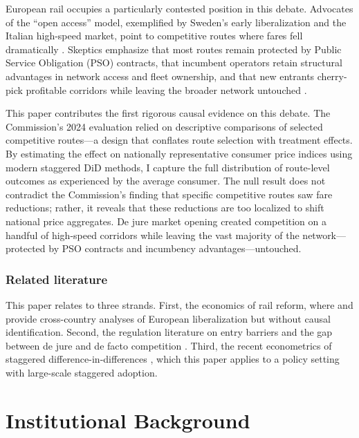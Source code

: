 \documentclass[12pt]{article}
\begin{document}
European rail occupies a particularly contested position in this debate. Advocates of the ``open access'' model, exemplified by Sweden's early liberalization and the Italian high-speed market, point to competitive routes where fares fell dramatically \citep{friebel2010competition, bougette2019competition}. Skeptics emphasize that most routes remain protected by Public Service Obligation (PSO) contracts, that incumbent operators retain structural advantages in network access and fleet ownership, and that new entrants cherry-pick profitable corridors while leaving the broader network untouched \citep{nash2008passenger, knieps2013competition, white2013evaluating}.

This paper contributes the first rigorous causal evidence on this debate. The Commission's 2024 evaluation \citep{ec2024fourth} relied on descriptive comparisons of selected competitive routes---a design that conflates route selection with treatment effects. By estimating the effect on nationally representative consumer price indices using modern staggered DiD methods, I capture the full distribution of route-level outcomes as experienced by the average consumer. The null result does not contradict the Commission's finding that specific competitive routes saw fare reductions; rather, it reveals that these reductions are too localized to shift national price aggregates. De jure market opening created competition on a handful of high-speed corridors while leaving the vast majority of the network---protected by PSO contracts and incumbency advantages---untouched.

\subsubsection*{Related literature} This paper relates to three strands. First, the economics of rail reform, where \citet{nash2008passenger} and \citet{friebel2010competition} provide cross-country analyses of European liberalization but without causal identification. Second, the regulation literature on entry barriers and the gap between de jure and de facto competition \citep{djankov2002regulation, peltzman1976toward, stigler1971theory}. Third, the recent econometrics of staggered difference-in-differences \citep{callaway2021difference, sunab2021, goodmanbacon2021, roth2023pretrends}, which this paper applies to a policy setting with large-scale staggered adoption.


\section{Institutional Background}
\end{document}
